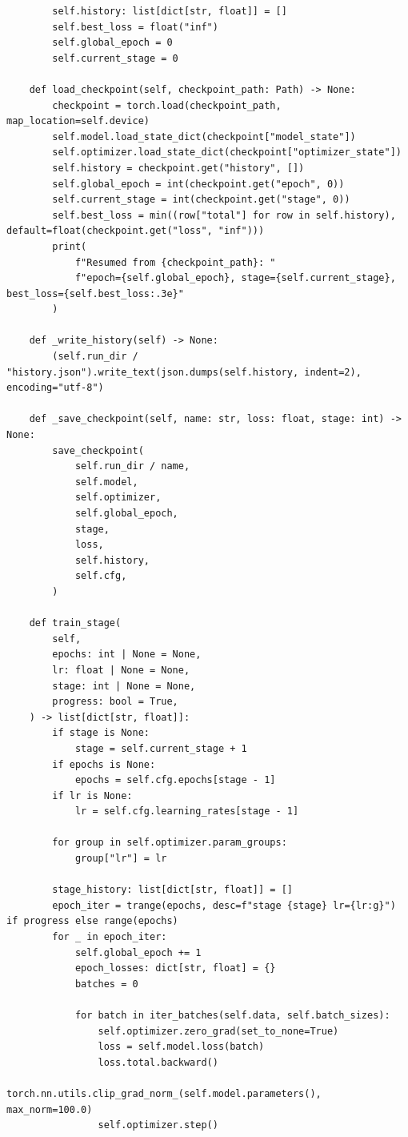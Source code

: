 \begin{lstlisting}
        self.history: list[dict[str, float]] = []
        self.best_loss = float("inf")
        self.global_epoch = 0
        self.current_stage = 0

    def load_checkpoint(self, checkpoint_path: Path) -> None:
        checkpoint = torch.load(checkpoint_path, map_location=self.device)
        self.model.load_state_dict(checkpoint["model_state"])
        self.optimizer.load_state_dict(checkpoint["optimizer_state"])
        self.history = checkpoint.get("history", [])
        self.global_epoch = int(checkpoint.get("epoch", 0))
        self.current_stage = int(checkpoint.get("stage", 0))
        self.best_loss = min((row["total"] for row in self.history), default=float(checkpoint.get("loss", "inf")))
        print(
            f"Resumed from {checkpoint_path}: "
            f"epoch={self.global_epoch}, stage={self.current_stage}, best_loss={self.best_loss:.3e}"
        )

    def _write_history(self) -> None:
        (self.run_dir / "history.json").write_text(json.dumps(self.history, indent=2), encoding="utf-8")

    def _save_checkpoint(self, name: str, loss: float, stage: int) -> None:
        save_checkpoint(
            self.run_dir / name,
            self.model,
            self.optimizer,
            self.global_epoch,
            stage,
            loss,
            self.history,
            self.cfg,
        )

    def train_stage(
        self,
        epochs: int | None = None,
        lr: float | None = None,
        stage: int | None = None,
        progress: bool = True,
    ) -> list[dict[str, float]]:
        if stage is None:
            stage = self.current_stage + 1
        if epochs is None:
            epochs = self.cfg.epochs[stage - 1]
        if lr is None:
            lr = self.cfg.learning_rates[stage - 1]

        for group in self.optimizer.param_groups:
            group["lr"] = lr

        stage_history: list[dict[str, float]] = []
        epoch_iter = trange(epochs, desc=f"stage {stage} lr={lr:g}") if progress else range(epochs)
        for _ in epoch_iter:
            self.global_epoch += 1
            epoch_losses: dict[str, float] = {}
            batches = 0

            for batch in iter_batches(self.data, self.batch_sizes):
                self.optimizer.zero_grad(set_to_none=True)
                loss = self.model.loss(batch)
                loss.total.backward()
                torch.nn.utils.clip_grad_norm_(self.model.parameters(), max_norm=100.0)
                self.optimizer.step()


\end{lstlisting}
